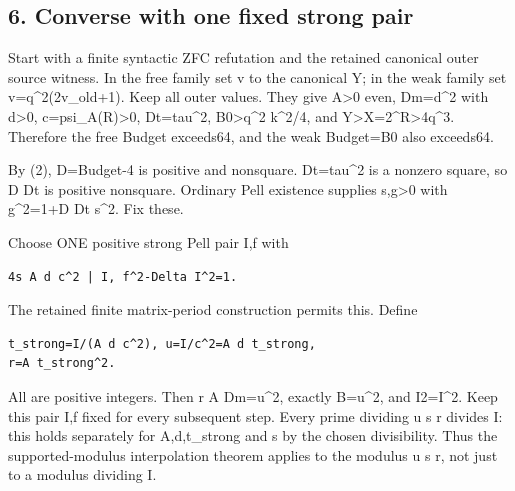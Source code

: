 \subsection{6. Converse with one fixed strong pair}



Start with a finite syntactic ZFC refutation and the retained canonical outer source witness. In the free family set v to the canonical Y; in the weak family set v=\allowbreak{}q\textasciicircum{}\allowbreak{}2(2v\_\allowbreak{}old+\allowbreak{}1). Keep all outer values. They give A\textgreater{}\allowbreak{}0 even, Dm=\allowbreak{}d\textasciicircum{}\allowbreak{}2 with d\textgreater{}\allowbreak{}0, c=\allowbreak{}psi\_\allowbreak{}A(R)\textgreater{}\allowbreak{}0, Dt=\allowbreak{}tau\textasciicircum{}\allowbreak{}2, B0\textgreater{}\allowbreak{}q\textasciicircum{}\allowbreak{}2 k\textasciicircum{}\allowbreak{}2/\allowbreak{}4, and Y\textgreater{}\allowbreak{}X=\allowbreak{}2\textasciicircum{}\allowbreak{}R\textgreater{}\allowbreak{}4q\textasciicircum{}\allowbreak{}3. Therefore the free Budget exceeds64, and the weak Budget=\allowbreak{}B0 also exceeds64.



By (2), D=\allowbreak{}Budget-4 is positive and nonsquare. Dt=\allowbreak{}tau\textasciicircum{}\allowbreak{}2 is a nonzero square, so D Dt is positive nonsquare. Ordinary Pell existence supplies s,g\textgreater{}\allowbreak{}0 with g\textasciicircum{}\allowbreak{}2=\allowbreak{}1+\allowbreak{}D Dt s\textasciicircum{}\allowbreak{}2. Fix these.



Choose ONE positive strong Pell pair I,f with



\begin{verbatim}
4s A d c^2 | I, f^2-Delta I^2=1.
\end{verbatim}

The retained finite matrix-period construction permits this. Define



\begin{verbatim}
t_strong=I/(A d c^2), u=I/c^2=A d t_strong,
r=A t_strong^2.
\end{verbatim}

All are positive integers. Then r A Dm=\allowbreak{}u\textasciicircum{}\allowbreak{}2, exactly B=\allowbreak{}u\textasciicircum{}\allowbreak{}2, and I2=\allowbreak{}I\textasciicircum{}\allowbreak{}2. Keep this pair I,f fixed for every subsequent step. Every prime dividing u s r divides I: this holds separately for A,d,t\_\allowbreak{}strong and s by the chosen divisibility. Thus the supported-modulus interpolation theorem applies to the modulus u s r, not just to a modulus dividing I.



